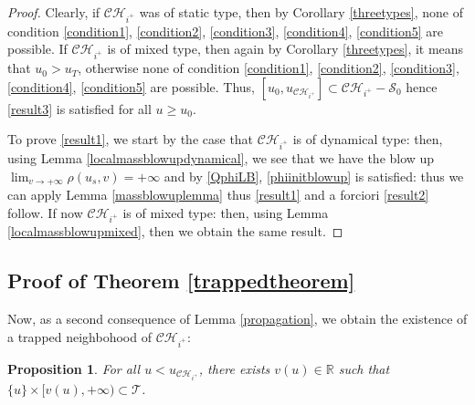 \documentclass[10pt,a4paper]{article}
\theoremstyle{plain}
\newtheorem{prop}[thm]{Proposition}
\theoremstyle{remark}
\newcommand{\T}{\mathcal{T}}
\theoremstyle{definition}
\newcommand{\RR}{\mathbb{R}}
\theoremstyle{plain}
\theoremstyle{remark}
\theoremstyle{definition}
\newcommand{\CH}{\mathcal{CH}_{i^+}}
\numberwithin{equation}{section}
\begin{document}
\begin{proof}
	Clearly, if $\CH$ was of static type, then by Corollary \ref{threetypes}, none of condition \eqref{condition1}, \eqref{condition2}, \eqref{condition3}, \eqref{condition4}, \eqref{condition5} are possible. If $\CH$ is of mixed type, then again by Corollary \ref{threetypes}, it means that $u_0>u_T$, otherwise none of condition \eqref{condition1}, \eqref{condition2}, \eqref{condition3}, \eqref{condition4}, \eqref{condition5} are possible. Thus, $[u_0,u_{\CH}] \subset \CH-\mathcal{S}_0$ hence \eqref{result3} is satisfied for all $u \geq u_0$.
	
	
	
	To prove \eqref{result1}, we start by the case that $\CH$ is of dynamical type: then, using Lemma \ref{localmassblowupdynamical}, we see that we have the blow up $\lim_{v \rightarrow+\infty} \rho(u_s,v)=+\infty$ and by \eqref{QphiLB}, \eqref{phiinitblowup} is satisfied: thus we can apply Lemma \ref{massblowuplemma} thus \eqref{result1} and a forciori \eqref{result2} follow.	If now $\CH$ is of mixed type: then, using Lemma \ref{localmassblowupmixed}, then we obtain the same result.
	
	
\end{proof}
\subsection{Proof of Theorem \ref{trappedtheorem}} 

Now, as a second consequence of Lemma \ref{propagation}, we obtain the existence of a trapped neighbohood of $\CH$:
\begin{prop} \label{trappedprop}
	For all $u < u_{\CH}$, there exists $v(u) \in \RR$ such that $\{u\} \times [v(u),+\infty) \subset \T$.
	
	
\end{prop}
\end{document}
